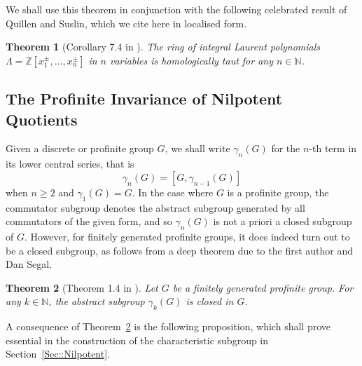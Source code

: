 \documentclass{amsart}
\newtheorem{theorem}{Theorem}
\numberwithin{theorem}{section}
\numberwithin{equation}{section}
\newcommand{\Z}{\mathbb{Z}}
\begin{document}
We shall use this theorem in conjunction with the following celebrated result of Quillen and Suslin, which we cite here in localised form.
\begin{theorem}[Corollary 7.4 in \cite{Suslin1977}]\label{Thm::Quillen-Suslin}
    The ring of integral Laurent polynomials $\Lambda = \Z[x^{\pm}_1, \ldots, x^{\pm}_n]$ in $n$ variables is homologically taut for any $n \in \mathbb{N}$.
\end{theorem}

\subsection{The Profinite Invariance of Nilpotent Quotients}
Given a discrete or profinite group $G$, we shall write $\gamma_n(G)$ for the $n$-th term in its lower central series, that is
\[
\gamma_n(G) = [G,\gamma_{n-1}(G)]
\]
when $n \geq 2$ and $\gamma_1(G) = G$. In the case where $G$ is a profinite group, the commutator subgroup denotes the abstract subgroup generated by all commutators of the given form, and so $\gamma_n(G)$ is not a priori a closed subgroup of $G$. However, for finitely generated profinite groups, it does indeed turn out to be a closed subgroup, as follows from a deep theorem due to the first author and Dan Segal.
\begin{theorem}[Theorem 1.4 in \cite{Nikolov2007}]\label{Thm::NS}
    Let $G$ be a finitely generated profinite group. For any $k \in \mathbb{N}$, the abstract subgroup $\gamma_k(G)$ is closed in $G$.
\end{theorem}

A consequence of Theorem~\ref{Thm::NS} is the following proposition, which shall prove essential in the construction of the characteristic subgroup in  Section~\ref{Sec::Nilpotent}.
\end{document}
